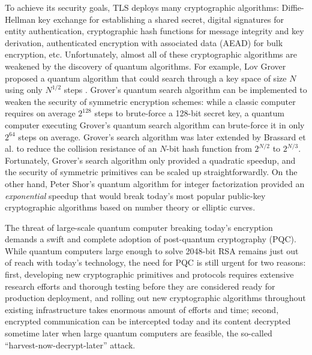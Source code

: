 \documentclass[letterpaper,12pt,titlepage,oneside,final]{book}
\begin{document}
To achieve its security goals, TLS deploys many cryptographic algorithms: Diffie-Hellman key exchange for establishing a shared secret, digital signatures for entity authentication, cryptographic hash functions for message integrity and key derivation, authenticated encryption with associated data (AEAD) for bulk encryption, etc.
Unfortunately, almost all of these cryptographic algorithms are weakened by the discovery of quantum algorithms.
For example, Lov Grover proposed a quantum algorithm that could search through a key space of size $N$ using only $N^{1/2}$ steps \cite{DBLP:conf/stoc/Grover96}.
Grover's quantum search algorithm can be implemented to weaken the security of symmetric encryption schemes:
while a classic computer requires on average $2^{128}$ steps to brute-force a 128-bit secret key, a quantum computer executing Grover's quantum search algorithm can brute-force it in only $2^{64}$ steps on average.
Grover's search algorithm was later extended by Brassard et al. \cite{DBLP:journals/sigact/BrassardHT97} to reduce the collision resistance of an $N$-bit hash function from $2^{N/2}$ to $2^{N/3}$.
Fortunately, Grover's search algorithm only provided a quadratic speedup, and the security of symmetric primitives can be scaled up straightforwardly.
On the other hand, Peter Shor's quantum algorithm for integer factorization \cite{DBLP:conf/focs/Shor94,DBLP:journals/siamcomp/Shor97} provided an {\it exponential} speedup that would break today's most popular public-key cryptographic algorithms based on number theory or elliptic curves.

The threat of large-scale quantum computer breaking today's encryption demands a swift and complete adoption of post-quantum cryptography (PQC).
While quantum computers large enough to solve 2048-bit RSA remains just out of reach with today's technology, the need for PQC is still urgent for two reasons: 
first, developing new cryptographic primitives and protocols requires extensive research efforts and thorough testing before they are considered ready for production deployment, and rolling out new cryptographic algorithms throughout existing infrastructure takes enormous amount of efforts and time; 
second, encrypted communication can be intercepted today and its content decrypted sometime later when large quantum computers are feasible, the so-called ``harvest-now-decrypt-later'' attack.
\end{document}
